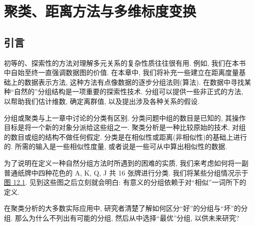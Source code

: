 
\chapter{聚类、距离方法与多维标度变换}
\label{chap:12}

\section{引言}
\label{sec:12.1}

初等的、探索性的方法对理解多元关系的复杂性质往往很有用. 例如, 我们在本书中自始至终一直强调数据图的价值. 在本章中, 我们将补充一些建立在距离度量基础上的数据表示方法, 这种方法有点像数据的逐步分组法则(算法). 在数据中寻找某种“自然的”分组结构是一项重要的探索性技术. 分组可以提供一些非正式的方法, 以帮助我们估计维数, 确定离群值, 以及提出涉及各种关系的假设.

分组或聚类与上一章中讨论的分类有区别. 分类问题中组的数目是已知的, 其操作目标是将一个新的对象分派给这些组之一. 聚类分析是一种比较原始的技术, 对组的数目或组的结构不做任何假定. 分类是在相似性或距离(非相似性)的基础上进行的. 所需的输入是一些相似性度量, 或者说是一些可从中算出相似性的数据.

为了说明在定义一种自然分组方法时所遇到的困难的实质, 我们来考虑如何将一副普通纸牌中四种花色的 A, K, Q, J 共 16 张牌进行分类. 我们将某些分组情况示于\hyperref[fig:12.1]{图 12.1}. 见到这些图之后立刻就会明白: 有意义的分组依赖于对“相似”一词所下的定义.

\begin{mvfigure}
\label{fig:12.1}
\end{mvfigure}

在聚类分析的大多数实际应用中, 研究者清楚了解如何区分“好”的分组与“坏”的分组. 那么为什么不列出有可能的分组, 然后从中选择“最优”分组, 以供未来研究?
